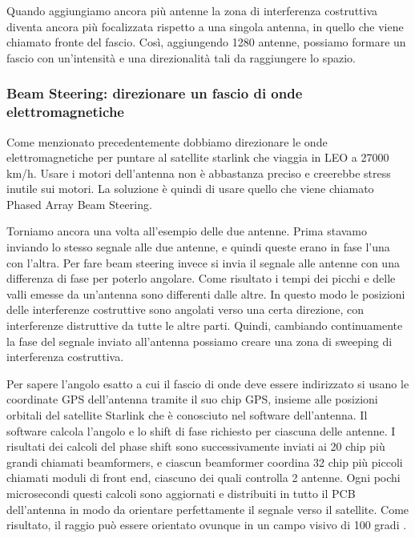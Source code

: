Quando aggiungiamo ancora più antenne la zona di interferenza costruttiva diventa ancora più focalizzata rispetto a una singola antenna, in quello che viene chiamato fronte del fascio.
Così, aggiungendo 1280 antenne, possiamo formare un fascio con un'intensità e una direzionalità tali da raggiungere lo spazio.\cite{branch_education_how_2022}


\subsubsection{Beam Steering: direzionare un fascio di onde elettromagnetiche}
Come menzionato precedentemente dobbiamo direzionare le onde elettromagnetiche per puntare al satellite starlink che viaggia in \ac{LEO} a 27000 km/h.
Usare i motori dell'antenna non è abbastanza preciso e creerebbe stress inutile sui motori.
La soluzione è quindi di usare quello che viene chiamato Phased Array Beam Steering.

Torniamo ancora una volta all'esempio delle due antenne.
Prima stavamo inviando lo stesso segnale alle due antenne, e quindi queste erano in fase l'una con l'altra.
Per fare beam steering invece si invia il segnale alle antenne con una differenza di fase per poterlo angolare.
Come risultato i tempi dei picchi e delle valli emesse da un'antenna sono differenti dalle altre.
In questo modo le posizioni delle interferenze costruttive sono angolati verso una certa direzione, con interferenze distruttive da tutte le altre parti.
Quindi, cambiando continuamente la fase del segnale inviato all'antenna possiamo creare una zona di sweeping di interferenza costruttiva.

Per sapere l'angolo esatto a cui il fascio di onde deve essere indirizzato si usano le coordinate GPS dell'antenna tramite il suo chip GPS, insieme alle posizioni orbitali del satellite Starlink che è conosciuto nel software dell'antenna.
Il software calcola l'angolo e lo shift di fase richiesto per ciascuna delle antenne.
I risultati dei calcoli del phase shift sono successivamente inviati ai 20 chip più grandi chiamati beamformers, e ciascun beamformer coordina 32 chip più piccoli chiamati moduli di front end, ciascuno dei quali controlla 2 antenne.
Ogni pochi microsecondi questi calcoli sono aggiornati e distribuiti in tutto il PCB dell'antenna in modo da orientare perfettamente il segnale verso il satellite.
Come risultato, il raggio può essere orientato ovunque in un campo visivo di 100 gradi \cite{branch_education_how_2022}.

